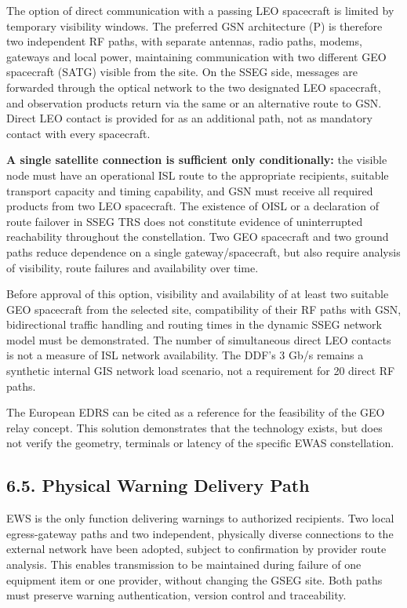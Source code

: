 The option of direct communication with a passing LEO spacecraft is limited by temporary visibility windows. The preferred GSN architecture (P) is therefore two independent RF paths, with separate antennas, radio paths, modems, gateways and local power, maintaining communication with two different GEO spacecraft (SATG) visible from the site. On the SSEG side, messages are forwarded through the optical network to the two designated LEO spacecraft, and observation products return via the same or an alternative route to GSN. Direct LEO contact is provided for as an additional path, not as mandatory contact with every spacecraft.

\textbf{A single satellite connection is sufficient only conditionally:} the visible node must have an operational ISL route to the appropriate recipients, suitable transport capacity and timing capability, and GSN must receive all required products from two LEO spacecraft. The existence of OISL or a declaration of route failover in SSEG TRS does not constitute evidence of uninterrupted reachability throughout the constellation. Two GEO spacecraft and two ground paths reduce dependence on a single gateway/\allowbreak{}spacecraft, but also require analysis of visibility, route failures and availability over time.

Before approval of this option, visibility and availability of at least two suitable GEO spacecraft from the selected site, compatibility of their RF paths with GSN, bidirectional traffic handling and routing times in the dynamic SSEG network model must be demonstrated. The number of simultaneous direct LEO contacts is not a measure of ISL network availability. The DDF's 3 Gb/\allowbreak{}s remains a synthetic internal GIS network load scenario, not a requirement for 20 direct RF paths.

The European EDRS can be cited as a reference for the feasibility of the GEO relay concept. This solution demonstrates that the technology exists, but does not verify the geometry, terminals or latency of the specific EWAS constellation.

\subsection{6.5. Physical Warning Delivery Path}\label{ddjf-6-5}

EWS is the only function delivering warnings to authorized recipients. Two local egress-gateway paths and two independent, physically diverse connections to the external network have been adopted, subject to confirmation by provider route analysis. This enables transmission to be maintained during failure of one equipment item or one provider, without changing the GSEG site. Both paths must preserve warning authentication, version control and traceability.

